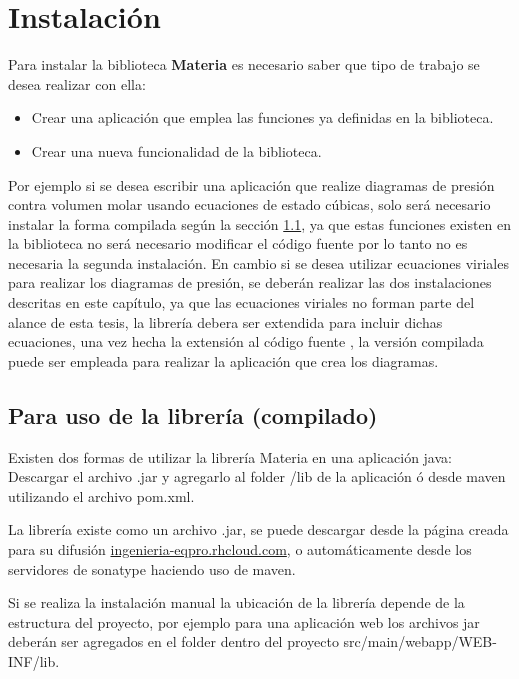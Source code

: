 \chapter{Instalación}

  Para instalar la biblioteca \textbf{Materia} es necesario saber que tipo de trabajo se desea realizar con ella:
  \begin{itemize}
    \item Crear una aplicación que emplea las funciones ya definidas en la biblioteca.
    \item Crear una nueva funcionalidad de la biblioteca.
  \end{itemize}

  Por ejemplo si se desea escribir una aplicación que realize diagramas de presión contra volumen molar usando ecuaciones de estado cúbicas, solo será necesario instalar la forma compilada según la sección \ref{sec:compiledinstall}, ya que estas funciones existen en la biblioteca no será necesario modificar el código fuente por lo tanto no es necesaria la segunda instalación. En cambio si se desea utilizar ecuaciones viriales para realizar los diagramas de presión, se deberán realizar las dos instalaciones descritas en este capítulo, ya que las ecuaciones viriales no forman parte del alance de esta tesis, la librería debera ser extendida para incluir dichas ecuaciones, una vez hecha la extensión al código fuente , la versión compilada puede ser empleada para realizar la aplicación que crea los diagramas.


  \section{Para uso de la librería (compilado)}\label{sec:compiledinstall}

      Existen dos formas de utilizar la librería Materia en una aplicación java:
    Descargar el archivo .jar y agregarlo al folder /lib de la aplicación ó desde maven utilizando el archivo pom.xml.

    La librería existe como un archivo .jar, se puede descargar desde la página creada para su difusión \url{ingenieria-eqpro.rhcloud.com}, o automáticamente desde los servidores de sonatype haciendo uso de maven.

    Si se realiza la instalación manual la ubicación de la librería depende de la estructura del proyecto, por ejemplo para una aplicación web los archivos jar deberán ser agregados en el folder dentro del proyecto src/main/webapp/WEB-INF/lib.

